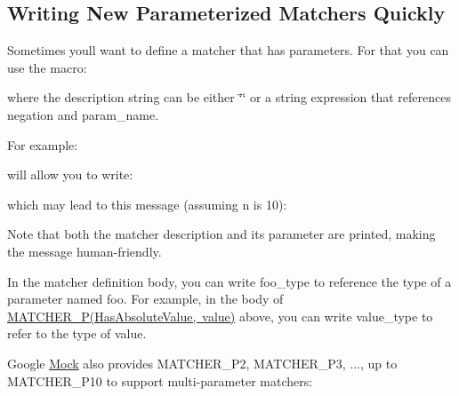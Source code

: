 \subsection*{Writing New Parameterized Matchers Quickly}

Sometimes you\textquotesingle{}ll want to define a matcher that has parameters. For that you can use the macro\+: 
\begin{DoxyCode}{0}
\end{DoxyCode}
 where the description string can be either {\ttfamily \char`\"{}\char`\"{}} or a string expression that references {\ttfamily negation} and {\ttfamily param\+\_\+name}.

For example\+: 
\begin{DoxyCode}{0}
\end{DoxyCode}
 will allow you to write\+: 
\begin{DoxyCode}{0}
\end{DoxyCode}
 which may lead to this message (assuming {\ttfamily n} is 10)\+: 
\begin{DoxyCode}{0}
\end{DoxyCode}


Note that both the matcher description and its parameter are printed, making the message human-\/friendly.

In the matcher definition body, you can write {\ttfamily foo\+\_\+type} to reference the type of a parameter named {\ttfamily foo}. For example, in the body of {\ttfamily \mbox{\hyperlink{_obj__test_2lib_2googletest-release-1_88_81_2googlemock_2include_2gmock_2gmock-generated-matchers_8h_acb7ae915efa2fd8d3f6ea7313198afb6}{M\+A\+T\+C\+H\+E\+R\+\_\+\+P(\+Has\+Absolute\+Value, value)}}} above, you can write {\ttfamily value\+\_\+type} to refer to the type of {\ttfamily value}.

Google \mbox{\hyperlink{class_mock}{Mock}} also provides {\ttfamily M\+A\+T\+C\+H\+E\+R\+\_\+\+P2}, {\ttfamily M\+A\+T\+C\+H\+E\+R\+\_\+\+P3}, ..., up to {\ttfamily M\+A\+T\+C\+H\+E\+R\+\_\+\+P10} to support multi-\/parameter matchers\+: 
\begin{DoxyCode}{0}
\end{DoxyCode}


